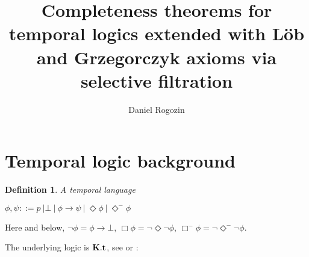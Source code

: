 \documentclass[a4paper]{article}
\date{}
\author{Daniel Rogozin}
\affil{Lomonosov Moscow State University}
\title{Completeness theorems for temporal logics extended with L\"{o}b and Grzegorczyk axioms via selective filtration}
\theoremstyle{defin}
\newtheorem{defin}{Definition}
\theoremstyle{theorem}
\theoremstyle{prop}
\theoremstyle{lemma}
\theoremstyle{ex}
\theoremstyle{col}
\newcommand{\BoxM}{\Box^{-}}
\newcommand{\DiamondM}{\Diamond^{-}}
\begin{document}
\maketitle

\section{Temporal logic background}

\begin{defin} A temporal language

\begin{center}
  $\phi, \psi ::= p \: | \bot \: | \: \phi \to \psi \: | \: \Diamond \phi \: | \: \DiamondM \phi$
\end{center}
\end{defin}

Here and below, $\neg \phi = \phi \to \bot$, $\Box \phi = \neg \Diamond \neg \phi$, $\BoxM \phi = \neg \DiamondM \neg \phi$.

The underlying logic is ${\bf K}.{\bf t}$, see \cite{Gabbay1994} or \cite{Goldblatt}:
\end{document}
